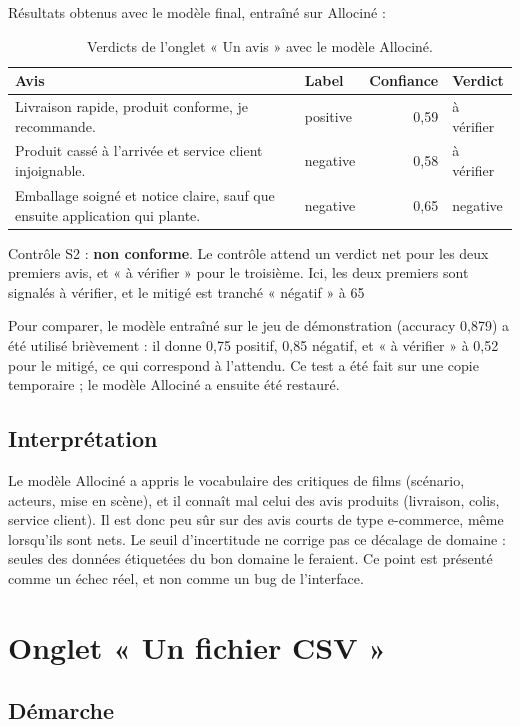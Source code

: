 \documentclass[11pt,a4paper]{article}
\begin{document}
Résultats obtenus avec le modèle final, entraîné sur Allociné :

\begin{table}[H]
\centering
\begin{tabular}{p{7cm}lrl}
\toprule
\textbf{Avis} & \textbf{Label} & \textbf{Confiance} & \textbf{Verdict} \\
\midrule
Livraison rapide, produit conforme, je recommande. & positive & 0,59 & à vérifier \\
Produit cassé à l'arrivée et service client injoignable. & negative & 0,58 & à vérifier \\
Emballage soigné et notice claire, sauf que ensuite application qui plante. & negative & 0,65 & negative \\
\bottomrule
\end{tabular}
\caption{Verdicts de l'onglet « Un avis » avec le modèle Allociné.}
\end{table}

Contrôle S2 : \textbf{non conforme}. Le contrôle attend un verdict net pour les deux premiers avis, et « à vérifier » pour le troisième. Ici, les deux premiers sont signalés à vérifier, et le mitigé est tranché « négatif » à 65 %

Pour comparer, le modèle entraîné sur le jeu de démonstration (accuracy 0,879) a été utilisé brièvement : il donne 0,75 positif, 0,85 négatif, et « à vérifier » à 0,52 pour le mitigé, ce qui correspond à l'attendu. Ce test a été fait sur une copie temporaire ; le modèle Allociné a ensuite été restauré.

\subsection{Interprétation}

Le modèle Allociné a appris le vocabulaire des critiques de films (scénario, acteurs, mise en scène), et il connaît mal celui des avis produits (livraison, colis, service client). Il est donc peu sûr sur des avis courts de type e-commerce, même lorsqu'ils sont nets. Le seuil d'incertitude ne corrige pas ce décalage de domaine : seules des données étiquetées du bon domaine le feraient. Ce point est présenté comme un échec réel, et non comme un bug de l'interface.

\section{Onglet « Un fichier CSV »}

\subsection{Démarche}
\end{document}
